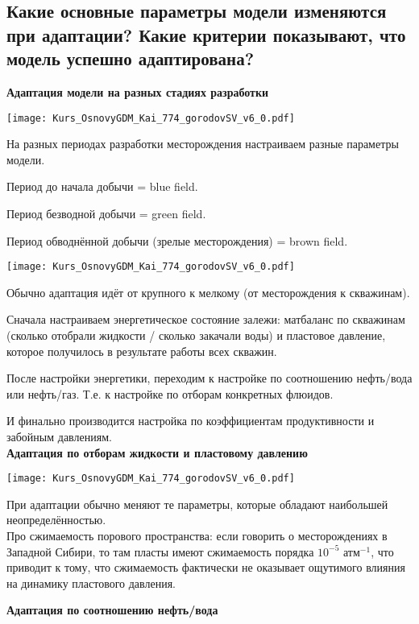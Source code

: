 

\subsection{Какие основные параметры модели изменяются при адаптации? Какие критерии показывают, что модель успешно адаптирована?}

\textbf{Адаптация модели на разных стадиях разработки}

\texttt{[image: Kurs\_OsnovyGDM\_Kai\_774\_gorodovSV\_v6\_0.pdf]}

На разных периодах разработки месторождения настраиваем разные параметры модели.

Период до начала добычи = blue field.

Период безводной добычи = green field.

Период обводнённой добычи (зрелые месторождения) = brown field.

\texttt{[image: Kurs\_OsnovyGDM\_Kai\_774\_gorodovSV\_v6\_0.pdf]}

Обычно адаптация идёт от крупного к мелкому (от месторождения к скважинам).

Сначала настраиваем энергетическое состояние залежи: матбаланс по скважинам (сколько отобрали жидкости / сколько закачали воды) и пластовое давление, которое получилось в результате работы всех скважин.

После настройки энергетики, переходим к настройке по соотношению нефть/вода или нефть/газ.
Т.е. к настройке по отборам конкретных флюидов.

И финально производится настройка по коэффициентам продуктивности и забойным давлениям.
\\

\textbf{Адаптация по отборам жидкости и пластовому давлению}

\texttt{[image: Kurs\_OsnovyGDM\_Kai\_774\_gorodovSV\_v6\_0.pdf]}

При адаптации обычно меняют те параметры, которые обладают наибольшей неопределённостью.
\\

Про сжимаемость порового пространства: если говорить о месторождениях в Западной Сибири, то там пласты имеют сжимаемость порядка $10^{-5} \text{ атм}^{-1}$, что приводит к тому, что сжимаемость фактически не оказывает ощутимого влияния на динамику пластового давления.

\textbf{Адаптация по соотношению нефть/вода}

